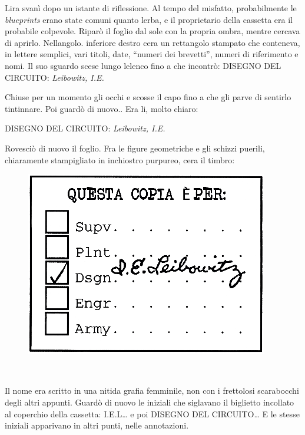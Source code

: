 L\textquotesingle ira svanì dopo un istante di riflessione. Al tempo del
misfatto, probabilmente le \emph{blueprints} erano state comuni quanto
l\textquotesingle erba, e il proprietario della cassetta era il
probabile colpevole. Riparò il foglio dal sole con la propria ombra,
mentre cercava di aprirlo. Nell\textquotesingle angolo. inferiore destro
c\textquotesingle era un rettangolo stampato che conteneva, in lettere
semplici, vari titoli, date, ``numeri dei brevetti'', numeri di
riferimento e nomi. Il suo sguardo scese lungo l\textquotesingle elenco
fino a che incontrò: DISEGNO DEL CIRCUITO: \emph{Leibowitz, I.E.}

Chiuse per un momento gli occhi e scosse il capo fino a che gli parve di
sentirlo tintinnare. Poi guardò di nuovo.. Era li, molto chiaro:

\begin{center}
	DISEGNO DEL CIRCUITO: \emph{Leibowitz, I.E.}
\end{center}

Rovesciò di nuovo il foglio. Fra le figure geometriche e gli schizzi
puerili, chiaramente stampigliato in inchiostro purpureo,
c\textquotesingle era il timbro:

\begin{figure}[h]
	\includegraphics[scale=0.4]{Immagini/timbro.png}
	\centering
\end{figure}

~

Il nome era scritto in una nitida grafia femminile, non con i frettolosi
scarabocchi degli altri appunti. Guardò di nuovo le iniziali che
siglavano il biglietto incollato al coperchio della cassetta:
I.E.L\ldots{} e poi DISEGNO DEL CIRCUITO\ldots{} E le stesse iniziali
apparivano in altri punti, nelle annotazioni.

